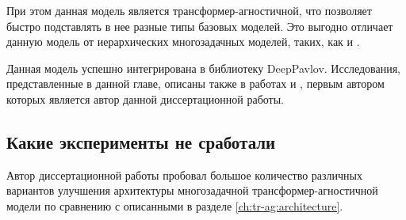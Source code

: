 При этом данная модель является трансформер-агностичной, что позволяет быстро подставлять в нее разные типы базовых моделей. Это выгодно отличает данную модель от иерархических многозадачных моделей, таких, как \cite{PAL:19} и \cite{TaskEmbedded2021}. 

Данная модель успешно интегрирована в библиотеку DeepPavlov\cite{Burtsev2018DeepPavlovAO}. Исследования, представленные в данной главе, описаны также в работах \cite{rumtl} и \cite{enmtl}, первым автором которых является автор данной диссертационной работы.

\subsection{Какие эксперименты не сработали}\label{ch:tr-ag:failed_attempts} 
Автор диссертационной работы пробовал большое количество различных вариантов улучшения архитектуры многозадачной трансформер-агностичной модели по сравнению с описанными в разделе \ref{ch:tr-ag:architecture}. 
